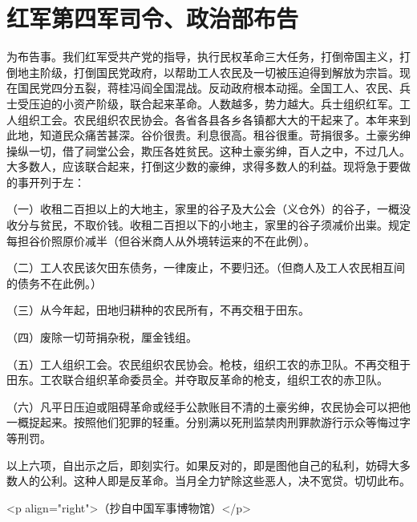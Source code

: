 \section[红军第四军司令、政治部布告（一九二九年六月）]{红军第四军司令、政治部布告}


为布告事。我们红军受共产党的指导，执行民权革命三大任务，打倒帝国主义，打倒地主阶级，打倒国民党政府，以帮助工人农民及一切被压迫得到解放为宗旨。现在国民党四分五裂，蒋桂冯阎全国混战。反动政府根本动摇。全国工人、农民、兵士受压迫的小资产阶级，联合起来革命。人数越多，势力越大。兵士组织红军。工人组织工会。农民组织农民协会。各省各县各乡各镇都大大的干起来了。本年来到此地，知道民众痛苦甚深。谷价很贵。利息很高。租谷很重。苛捐很多。土豪劣绅操纵一切，借了祠堂公会，欺压各姓贫民。这种土豪劣绅，百人之中，不过几人。大多数人，应该联合起来，打倒这少数的豪绅，求得多数人的利益。现将急于要做的事开列于左：

（一）收租二百担以上的大地主，家里的谷子及大公会（义仓外）的谷子，一概没收分与贫民，不取价钱。收租二百担以下的小地主，家里的谷子须减价出粜。规定每担谷价照原价减半（但谷米商人从外境转运来的不在此例）。

（二）工人农民该欠田东债务，一律废止，不要归还。（但商人及工人农民相互间的债务不在此例。）

（三）从今年起，田地归耕种的农民所有，不再交租于田东。

（四）废除一切苛捐杂税，厘金钱组。

（五）工人组织工会。农民组织农民协会。枪枝，组织工农的赤卫队。不再交租于田东。工农联合组织革命委员全。并夺取反革命的枪支，组织工农的赤卫队。

（六）凡平日压迫或阻碍革命或经手公款账目不清的土豪劣绅，农民协会可以把他一概捉起来。按照他们犯罪的轻重。分别满以死刑监禁肉刑罪款游行示众等悔过字等刑罚。

以上六项，自出示之后，即刻实行。如果反对的，即是图他自己的私利，妨碍大多数人的公利。这种人即是反革命。当月全力铲除这些恶人，决不宽贷。切切此布。

<p align="right">（抄自中国军事博物馆）</p>


